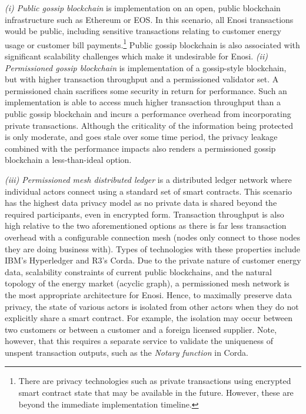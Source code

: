 \documentclass[a4paper,12pt,reqno]{amsart}
\theoremstyle{definition}
\begin{document}
\textit{(i) Public gossip blockchain} is implementation on an open, public blockchain infrastructure such as Ethereum or EOS. In this scenario, all Enosi transactions would be public, including sensitive transactions relating to customer energy usage or customer bill payments.\footnote{ There are privacy technologies such as private transactions using encrypted smart contract state that may be available in the future. However, these are beyond the immediate implementation timeline.} Public gossip blockchain is also associated with significant scalability challenges which make it undesirable for Enosi. \textit{(ii) Permissioned gossip blockchain} is implementation of a gossip-style blockchain, but with higher transaction throughput and a permissioned validator set. A permissioned chain sacrifices some security in return for performance. Such an implementation is able to access much higher transaction throughput than a public gossip blockchain and incurs a performance overhead from incorporating private transactions. Although the criticality of the information being protected is only moderate, and goes stale over some time period, the privacy leakage combined with the performance impacts also renders a permissioned gossip blockchain a less-than-ideal option.

\textit{(iii) Permissioned mesh distributed ledger} is a distributed ledger network where individual actors connect using a standard set of smart contracts. This scenario has the highest data privacy model as no private data is shared beyond the required participants, even in encrypted form. Transaction throughput is also high relative to the two aforementioned options as there is far less transaction overhead with a configurable connection mesh (nodes only connect to those nodes they are doing business with). Types of technologies with these properties include IBM's Hyperledger and R3's Corda. Due to the private nature of customer energy data, scalability constraints of current public blockchains, and the natural topology of the energy market (acyclic graph), a permissioned mesh network is the most appropriate architecture for Enosi. Hence, to maximally preserve data privacy, the state of various actors is isolated from other actors when they do not explicitly share a smart contract. For example, the isolation may occur between two customers or between a customer and a foreign licensed supplier. Note, however, that this requires a separate service to validate the uniqueness of unspent transaction outputs, such as the \textit{Notary function} in Corda.
\end{document}
